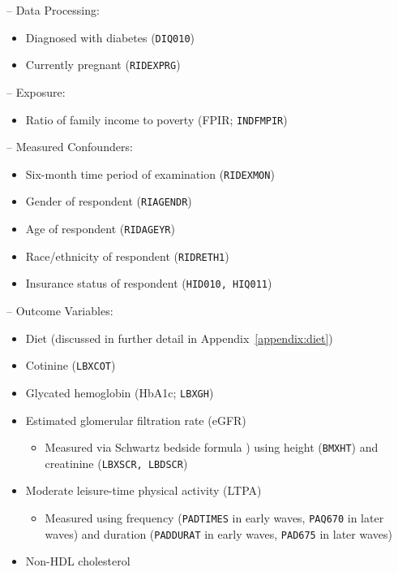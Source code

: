 \documentclass[12pt,leqno,titlepage]{amsart}
\newcommand{\1}{\mathbbm{1}}
\begin{document}
\begin{bibunit}
-- Data Processing:
\begin{itemize}
    \item Diagnosed with diabetes (\texttt{DIQ010})
    \item Currently pregnant (\texttt{RIDEXPRG})
\end{itemize}
\vspace{1em}
-- Exposure:
\begin{itemize}
    \item Ratio of family income to poverty (FPIR;  \texttt{INDFMPIR})
\end{itemize}
\vspace{1em}
-- Measured Confounders:
\begin{itemize}
    \item Six-month time period of examination (\texttt{RIDEXMON})
    \item Gender of respondent (\texttt{RIAGENDR})
    \item Age of respondent (\texttt{RIDAGEYR})
    \item Race/ethnicity of respondent (\texttt{RIDRETH1})
    \item Insurance status of respondent (\texttt{HID010, HIQ011})
\end{itemize}
\vspace{1em}
-- Outcome Variables:
\begin{itemize}
    \item Diet (discussed in further detail in Appendix~\ref{appendix:diet})
    \item Cotinine (\texttt{LBXCOT})
    \item Glycated hemoglobin (HbA1c; \texttt{LBXGH})
    \item Estimated glomerular filtration rate (eGFR)
    \begin{itemize}
        \item Measured via Schwartz bedside formula \citep{schwartz2009new}) using height (\texttt{BMXHT}) and creatinine (\texttt{LBXSCR, LBDSCR})
    \end{itemize}
    \item Moderate leisure-time physical activity (LTPA)
        \begin{itemize}
        \item Measured using frequency (\texttt{PADTIMES} in early waves, \texttt{PAQ670} in later waves) and duration (\texttt{PADDURAT} in early waves, \texttt{PAD675} in later waves)
    \end{itemize}
    \item Non-HDL cholesterol

\end{itemize}
\end{bibunit}
\end{document}
